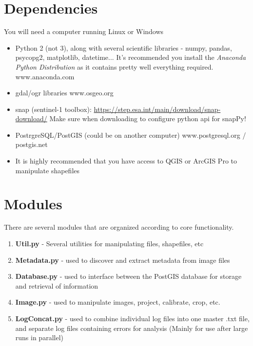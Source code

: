 \documentclass[letterpaper,10pt,openany,oneside]{sphinxmanual}
\begin{document}
\section{Dependencies}
\label{project:dependencies}
You will need a computer running Linux or Windows
\begin{itemize}
\item {} 
Python 2 (not 3), along with several scientific libraries - numpy,
pandas, psycopg2, matplotlib, datetime... It's recommended you install the
\emph{Anaconda Python Distribution} as it contains pretty well everything required.
www.anaconda.com

\item {} 
gdal/ogr libraries
www.osgeo.org

\item {} 
snap (sentinel-1 toolbox): \href{https://step.esa.int/main/download/snap-download/}{https://step.esa.int/main/download/snap-download/}
Make sure when downloading to configure python api for snapPy!

\item {} 
PostrgreSQL/PostGIS (could be on another computer)
www.postgresql.org / postgis.net

\item {} 
It is highly recommended that you have access to QGIS or ArcGIS Pro to
manipulate shapefiles

\end{itemize}


\section{Modules}
\label{project:modules}
There are several modules that are organized according to core
functionality.
\begin{enumerate}
\item {} 
\textbf{Util.py} - Several utilities for manipulating files,
shapefiles, etc

\item {} 
\textbf{Metadata.py} - used to discover and extract metadata from image
files

\item {} 
\textbf{Database.py} - used to interface between the PostGIS database for
storage and retrieval of information

\item {} 
\textbf{Image.py} - used to manipulate images, project, calibrate, crop,
etc.

\item {} 
\textbf{LogConcat.py} - used to combine individual log files into one
master .txt file, and separate log files containing errors for
analysis (Mainly for use after large runs in parallel)

\end{enumerate}
\end{document}
